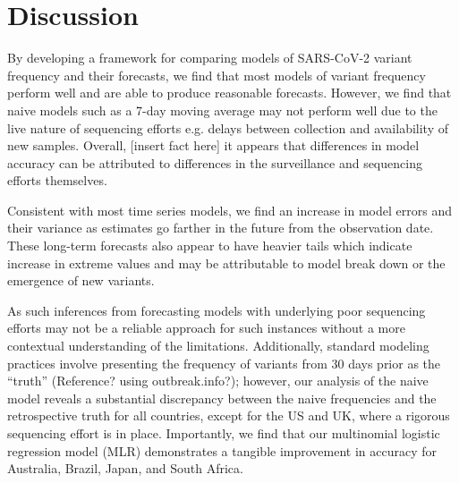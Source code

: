 \documentclass[11pt,oneside,letterpaper]{article}
\begin{document}
\section*{Discussion}




By developing a framework for comparing models of SARS-CoV-2 variant frequency and their forecasts, we find that most models of variant frequency perform well and are able to produce reasonable forecasts.
However, we find that naive models such as a 7-day moving average may not perform well due to the live nature of sequencing efforts e.g. delays between collection and availability of new samples.
Overall, [insert fact here] it appears that differences in model accuracy can be attributed to differences in the surveillance and sequencing efforts themselves.

Consistent with most time series models, we find an increase in model errors and their variance as estimates go farther in the future from the observation date.
These long-term forecasts also appear to have heavier tails which indicate increase in extreme values and may be attributable to model break down or the emergence of new variants.  

%



As such inferences from forecasting models with underlying poor sequencing efforts may not be a reliable approach for such instances without a more contextual understanding of the limitations.
Additionally, standard modeling practices involve presenting the frequency of variants from 30 days prior as the ``truth'' (Reference? using outbreak.info?); however, our analysis of the naive model reveals a substantial discrepancy between the naive frequencies and the retrospective truth for all countries, except for the US and UK, where a rigorous sequencing effort is in place. 
Importantly, we find that our multinomial logistic regression model (MLR) demonstrates a tangible improvement in accuracy for Australia, Brazil, Japan, and South Africa.
\end{document}
